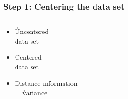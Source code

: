 \documentclass[t]{beamer} %
\begin{document}
\begin{frame}[c]
  \frametitle{Step 1: Centering the data set}

  \begin{columns}[c]
    \begin{column}{35mm}
      \begin{itemize}
      \item \h<beamer:1| handout:1>{Uncentered\\ data set}%
        \gap
      \item \h<beamer:2| handout:2>{Centered\\ data set}%
        \gap
      \item Distance information\\= \h<beamer:3| handout:3>{variance}%
        \gap
      \end{itemize}
    \end{column}
    \begin{column}{65mm}

\end{column}
\end{columns}
\end{frame}
\end{document}
